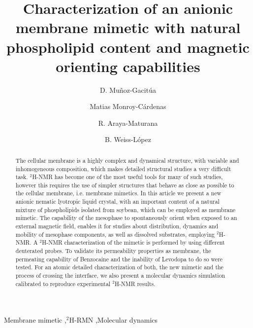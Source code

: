 \documentclass[3p,preprint,review]{elsarticle}
\title{Characterization of an anionic membrane mimetic with natural phospholipid
	content and magnetic
	orienting capabilities}
\author[1]{D. Muñoz-Gacitúa\corref{cor1}}
\author[2]{Matias Monroy-Cárdenas}
\author[2]{R. Araya-Maturana}
\author[1]{B. Weiss-López}
\begin{document}
	
	\begin{abstract}
		The cellular membrane is a highly complex and dynamical structure, with
		variable and inhomogeneous composition, which makes detailed structural studies
		a very difficult task. $^2$H-NMR has become one of the most useful tools for
		many of such studies, however this requires the use of simpler structures that
		behave as close as possible to the cellular membrane, i.e. membrane mimetics. In
		this article we present a new anionic nematic lyotropic liquid crystal, with an
		important content of a natural mixture of phospholipids isolated from soybean,
		which can be employed as membrane mimetic. The capability of the mesophase to
		spontaneously orient when exposed to an external magnetic field, enables it for
		studies about distribution, dynamics and mobility of mesophase components, as
		well as dissolved substrates, employing $^2$H-NMR. A $^2$H-NMR characterization
		of the mimetic is performed by using different deuterated probes. To validate
		its permeability properties as membrane, the permeating capability of Benzocaine
		and the inability of Levodopa to do so were tested. For an atomic detailed
		characterization of both, the new mimetic and the process of crossing the
		interface, we also present a molecular dynamics simulation calibrated to
		reproduce experimental $^2$H-NMR results.
	\end{abstract}
	
	\begin{keyword}
		Membrane mimetic \sep $^2$H-RMN \sep Molecular dynamics
	\end{keyword}
	
	\maketitle
	
	\renewcommand{\thefootnote}{\alph{footnote}}
\end{document}
